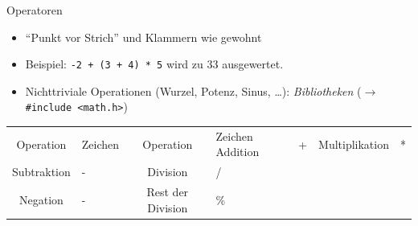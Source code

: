 \begin{frame}[fragile]{Operatoren}
%
\begin{itemize}
	\item \enquote{Punkt vor Strich} und Klammern wie gewohnt
	\item Beispiel: \texttt{-2 + (3 + 4) * 5} wird zu 33 ausgewertet.
	\item Nichttriviale Operationen (Wurzel, Potenz, Sinus, \ldots): \emph{Bibliotheken}\newline
		($\rightarrow$ \texttt{#include <math.h>})
\end{itemize}
%
\begin{center}
\begin{tcolorbox}[title=Grundrechenarten in C]
\begin{table}
	\small
\begin{tabularx}
	{.8\linewidth}
	{cC|cC}
	\toprule[1pt]
	
	Operation   & \normalfont Zeichen  &  Operation         & \normalfont Zeichen \tabcrlf
	Addition    & +                    &  Multiplikation    & * \\
	Subtraktion & -                    &  Division          & / \\
	Negation    & -                    &  Rest der Division & \%
\end{tabularx}
\end{table}
\end{tcolorbox}
\end{center}
%
\end{frame}


